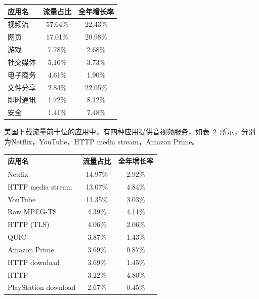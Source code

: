 \begin{table}[!htbp]
    \label{tab:Differentapplication}
    \centering
    \footnotesize%
    \setlength{\tabcolsep}{4pt}%
    \renewcommand{\arraystretch}{1.2}%
    \begin{tabular}{lcc}
        \hline
        应用名&流量占比&全年增长率\\
        \hline
        视频流&57.64\%&22.43\%\\
        网页&17.01\%&20.98\%\\
        游戏&7.78\%&2.68\%\\
        社交媒体&5.10\%&3.73\%\\
        电子商务&4.61\%&1.90\%\\
        文件分享&2.84\%&22.05\%\\
        即时通讯&1.72\%&8.12\%\\
        安全&1.41\%&7.48\%\\
        \hline
    \end{tabular}
\end{table}

美国下载流量前十位的应用中，有四种应用提供音视频服务，如表~\ref{tab:Differentdownload}~所示，分别为Netflix，YouTube，HTTP media stream，Amazon Prime。

\begin{table}[!htbp]
    \label{tab:Differentdownload}
    \centering
    \footnotesize%
    \setlength{\tabcolsep}{4pt}%
    \renewcommand{\arraystretch}{1.2}%
    \begin{tabular}{lcc}
        \hline
        应用名&流量占比&全年增长率\\
        \hline
        Netflix&14.97\%&2.92\%\\
        HTTP media stream&13.07\%&4.84\%\\
        YouTube&11.35\%&3.03\%\\
        Raw MPEG-TS&4.39\%&4.11\%\\
        HTTP (TLS)&4.06\%	&2.06\%\\
        QUIC&3.87\%&1.43\%\\
        Amazon Prime&3.69\%&0.87\%\\
        HTTP download&3.69\%&1.45\%\\
        HTTP&3.22\%&4.80\%\\
        PlayStation download&2.67\%&0.45\%\\
        \hline
    \end{tabular}
\end{table}

